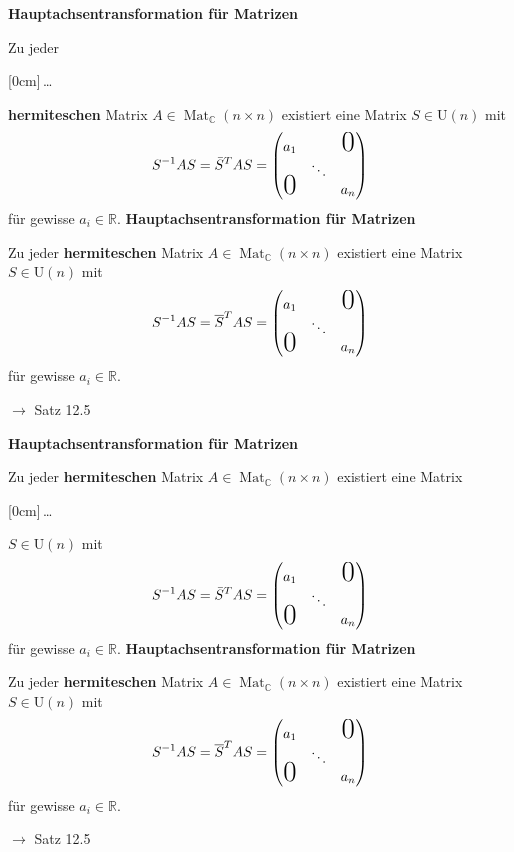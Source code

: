 \documentclass[11pt]{article}
\renewcommand{\cite}[1]{\par\bigskip\hfill{\color{gray}\tiny\(\to\) #1}}
\newcommand{\CC}{\mathbb{C}}
\newcommand{\RR}{\mathbb{R}}
\DeclareMathOperator{\Mat}{Mat}
\newcommand{\hide}[1]{\parbox{0cm}{\raisebox{-7pt}[0cm]{\dots}}\color{white}#1\color{black}}
\let\olddots\dots
\renewcommand{\dots}{\,\olddots\,}
\newenvironment{field}{}{\newpage}
\newif\ifnote
\newenvironment{note}{\notetrue}{\notefalse}
\newcommand{\localtag}{}
\newcommand{\globaltag}{}
\newcommand{\uuid}{}
\newcommand{\tags}[1]{
    \ifnote
        \renewcommand{\localtag}{#1}
    \else
        \renewcommand{\globaltag}{#1}
    \fi
    }
\newcommand{\xplain}[1]{\renewcommand{\uuid}{#1}}
\begin{document}
\begin{note}
    \tags{Satz}
    \xplain{6b695356-9bb9-415a-b938-df47fa36982d}

    \begin{field}
        \textbf{Hauptachsentransformation für Matrizen}

        Zu jeder \hide{\textbf{hermiteschen}} Matrix $A\in\Mat_{\CC}(n\times n)$ existiert eine Matrix $S\in\text{U}(n)$ mit
        \[S^{-1}AS = \bar{S}^TAS = \begin{pmatrix}
            a_1&&\text{\huge 0}\\
            & \ddots&\\
            \smash{\text{\huge 0}}&& a_n
        \end{pmatrix}\]
        für gewisse $a_i\in\RR$.
    \end{field}
    \begin{field}
        \textbf{Hauptachsentransformation für Matrizen}

        Zu jeder \textbf{hermiteschen} Matrix $A\in\Mat_{\CC}(n\times n)$ existiert eine Matrix $S\in\text{U}(n)$ mit
        \[S^{-1}AS = \overline{S}^TAS = \begin{pmatrix}
            a_1&&\text{\huge 0}\\
            & \ddots&\\
            \smash{\text{\huge 0}}&& a_n
        \end{pmatrix}\]
        für gewisse $a_i\in\RR$.
        \cite{Satz 12.5}
    \end{field}

    \begin{field}
        \textbf{Hauptachsentransformation für Matrizen}

        Zu jeder \textbf{hermiteschen} Matrix $A\in\Mat_{\CC}(n\times n)$ existiert eine Matrix \hide{$S\in\text{U}(n)$} mit
        \[S^{-1}AS = \bar{S}^TAS = \begin{pmatrix}
            a_1&&\text{\huge 0}\\
            & \ddots&\\
            \smash{\text{\huge 0}}&& a_n
        \end{pmatrix}\]
        für gewisse $a_i\in\RR$.
    \end{field}
    \begin{field}
        \textbf{Hauptachsentransformation für Matrizen}

        Zu jeder \textbf{hermiteschen} Matrix $A\in\Mat_{\CC}(n\times n)$ existiert eine Matrix $S\in\text{U}(n)$ mit
        \[S^{-1}AS = \overline{S}^TAS = \begin{pmatrix}
            a_1&&\text{\huge 0}\\
            & \ddots&\\
            \smash{\text{\huge 0}}&& a_n
        \end{pmatrix}\]
        für gewisse $a_i\in\RR$.
        \cite{Satz 12.5}
    \end{field}


\end{note}
\end{document}
